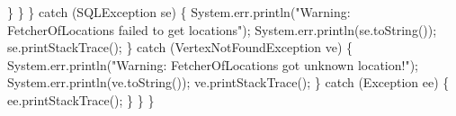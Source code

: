         \}
      \}
    \} catch (SQLException se) \{
      System.err.println("Warning: FetcherOfLocations failed to get locations");
      System.err.println(se.toString());
      se.printStackTrace();
    \} catch (VertexNotFoundException ve) \{
      System.err.println("Warning: FetcherOfLocations got unknown location!");
      System.err.println(ve.toString());
      ve.printStackTrace();
    \} catch (Exception ee) \{
      ee.printStackTrace();
    \}
  \}
\}
\nwendcode{}\nwdocspar

